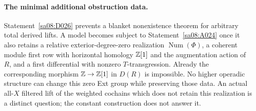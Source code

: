 \paragraph{The minimal additional obstruction data.}
Statement~\ref{sa08:D026} prevents a blanket nonexistence theorem
for arbitrary total derived lifts. A model becomes subject to
Statement~\ref{sa08:A024} once it also retains a relative
exterior-degree-zero realization $\operatorname{Num}(\Phi)$,
a coherent module first row with horizontal homology $\mathbb Z[1]$
and the augmentation action of $R$, and a first differential
with nonzero $T$-transgression. Already the corresponding
morphism $\mathbb Z\to\mathbb Z[1]$ in $D(R)$ is impossible. No higher
operadic structure can change this zero Ext group while
preserving those data. An actual all-$X$ filtered lift of the
weighted cochains which does not retain this realization is a
distinct question; the constant construction does not answer it.
